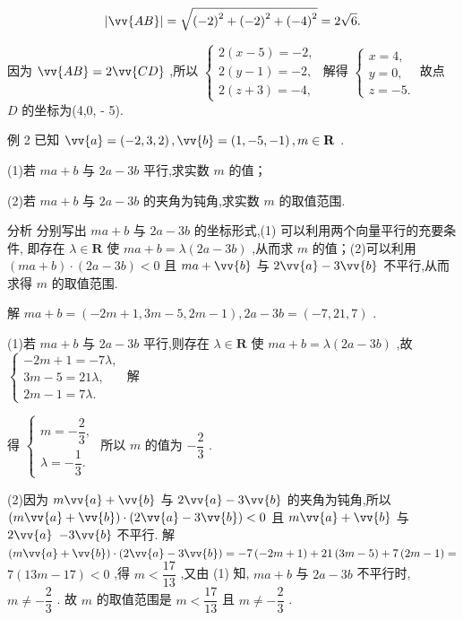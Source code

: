 \[
\left| \vv{AB}\right|  = \sqrt{{\left( -2\right) }^{2} + {\left( -2\right) }^{2} + {\left( -4\right) }^{2}} = 2\sqrt{6}.
\]

因为 $\vv{AB} = 2\vv{CD}$ ,所以 $\left\{  \begin{array}{l} 2\left( {x - 5}\right)  =  - 2, \\  2\left( {y - 1}\right)  =  - 2, \\  2\left( {z + 3}\right)  =  - 4, \end{array}\right.$ 解得 $\left\{  \begin{array}{l} x = 4, \\  y = 0, \\  z =  - 5. \end{array}\right.$ 故点 $D$ 的坐标为(4,0, - 5).

例 2 已知 $\vv{a} = \left( {-2,3,2}\right) ,\vv{b} = \left( {1, - 5, - 1}\right) ,m \in  \mathbf{R}$ .

(1)若 ${ma} + b$ 与 ${2a} - {3b}$ 平行,求实数 $m$ 的值；

(2)若 ${ma} + b$ 与 ${2a} - {3b}$ 的夹角为钝角,求实数 $m$ 的取值范围.

分析 分别写出 ${ma} + b$ 与 ${2a} - {3b}$ 的坐标形式,(1) 可以利用两个向量平行的充要条件, 即存在 $\lambda  \in  \mathbf{R}$ 使 ${ma} + b = \lambda \left( {{2a} - {3b}}\right)$ ,从而求 $m$ 的值；(2)可以利用 $\left( {{ma} + b}\right)  \cdot  \left( {{2a} - {3b}}\right)  < 0$ 且 ${ma} + \vv{b}$ 与 $2\vv{a} - 3\vv{b}$ 不平行,从而求得 $m$ 的取值范围.

解 ${ma} + b = \left( {-{2m} + 1,{3m} - 5,{2m} - 1}\right) ,{2a} - {3b} = \left( {-7,{21},7}\right)$ .

(1)若 ${ma} + b$ 与 ${2a} - {3b}$ 平行,则存在 $\lambda  \in  \mathbf{R}$ 使 ${ma} + b = \lambda \left( {{2a} - {3b}}\right)$ ,故 $\left\{  \begin{array}{l}  - {2m} + 1 =  - {7\lambda }, \\  {3m} - 5 = {21\lambda }, \\  {2m} - 1 = {7\lambda }. \end{array}\right.$ 解

得 $\left\{  \begin{array}{l} m =  - \dfrac{2}{3}, \\  \lambda  =  - \dfrac{1}{3}. \end{array}\right.$ 所以 $m$ 的值为 $- \dfrac{2}{3}$ .

(2)因为 $m\vv{a} + \vv{b}$ 与 $2\vv{a} - 3\vv{b}$ 的夹角为钝角,所以 $\left( {m\vv{a} + \vv{b}}\right)  \cdot  \left( {2\vv{a} - 3\vv{b}}\right)  < 0$ 且 $m\vv{a} + \vv{b}$ 与 $2\vv{a}$  $- 3\vv{b}$ 不平行. 解 $\left( {m\vv{a} + \vv{b}}\right)  \cdot  \left( {2\vv{a} - 3\vv{b}}\right)  =  - 7\left( {-{2m} + 1}\right)  + {21}\left( {{3m} - 5}\right)  + 7\left( {{2m} - 1}\right)  =$  $7\left( {{13m} - {17}}\right)  < 0$ ,得 $m < \dfrac{17}{13}$ ,又由 (1) 知, ${ma} + b$ 与 ${2a} - {3b}$ 不平行时, $m \neq   - \dfrac{2}{3}$ . 故 $m$ 的取值范围是 $m < \dfrac{17}{13}$ 且 $m \neq   - \dfrac{2}{3}$ .

